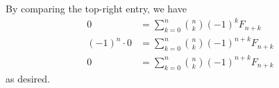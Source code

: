 \begin{enumerate}
\begin{enumerate}
                    By comparing the top-right entry, we have
                    \begin{align*}
                        0              & = \sum_{k = 0}^{n} \binom{n}{k} (-1)^k F_{n + k}       \\
                        (-1)^n \cdot 0 & = \sum_{k = 0}^{n} \binom{n}{k} (-1)^{n + k} F_{n + k} \\
                        0              & = \sum_{k = 0}^{n} \binom{n}{k} (-1)^{n + k} F_{n + k}
                    \end{align*}
                    as desired.
          \end{enumerate}
\end{enumerate}